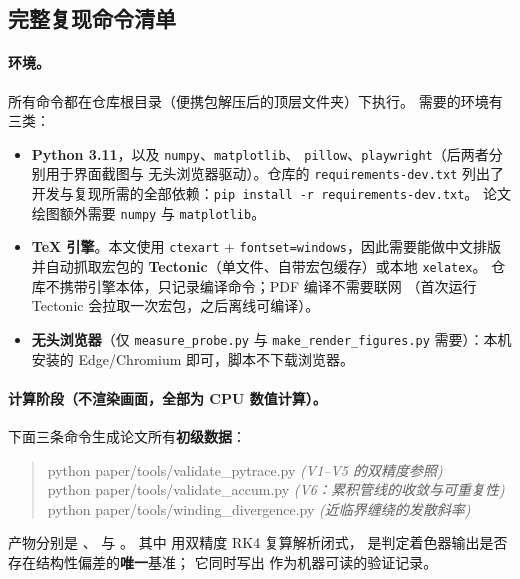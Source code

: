 \subsection{完整复现命令清单}\label{app:commands}

\paragraph{环境。}
所有命令都在仓库根目录（便携包解压后的顶层文件夹）下执行。
需要的环境有三类：

\begin{itemize}[leftmargin=1.6em,itemsep=2pt,topsep=3pt]
  \item \textbf{Python 3.11}，以及 \texttt{numpy}、\texttt{matplotlib}、
        \texttt{pillow}、\texttt{playwright}（后两者分别用于界面截图与
        无头浏览器驱动）。仓库的 \texttt{requirements-dev.txt} 列出了
        开发与复现所需的全部依赖：\texttt{pip install -r requirements-dev.txt}。
        论文绘图额外需要 \texttt{numpy} 与 \texttt{matplotlib}。
  \item \textbf{\TeX{} 引擎}。本文使用 \texttt{ctexart} +
        \texttt{fontset=windows}，因此需要能做中文排版并自动抓取宏包的
        \textbf{Tectonic}（单文件、自带宏包缓存）或本地 \texttt{xelatex}。
        仓库不携带引擎本体，只记录编译命令；PDF 编译不需要联网
        （首次运行 Tectonic 会拉取一次宏包，之后离线可编译）。
  \item \textbf{无头浏览器}（仅 \texttt{measure\_probe.py} 与
        \texttt{make\_render\_figures.py} 需要）：本机安装的
        Edge/Chromium 即可，脚本不下载浏览器。
\end{itemize}

\paragraph{计算阶段（不渲染画面，全部为 CPU 数值计算）。}
下面三条命令生成论文所有\textbf{初级数据}：

\begin{quote}\ttfamily\small
python paper/tools/validate\_pytrace.py \hfill\emph{(V1--V5 的双精度参照)}\\
python paper/tools/validate\_accum.py \hfill\emph{(V6：累积管线的收敛与可重复性)}\\
python paper/tools/winding\_divergence.py \hfill\emph{(近临界缠绕的发散斜率)}
\end{quote}

\noindent 产物分别是 、
 与 。
其中  用双精度 RK4 复算解析闭式，
是判定着色器输出是否存在结构性偏差的\textbf{唯一}基准；
它同时写出  作为机器可读的验证记录。

